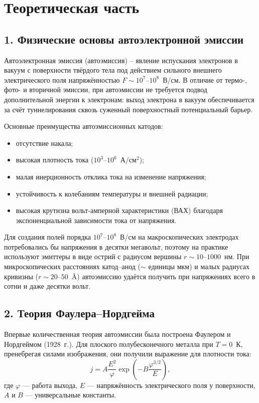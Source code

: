 \documentclass[12pt, a4paper]{article}
\begin{document}
\newpage


\section*{Теоретическая часть}

\subsection*{1. Физические основы автоэлектронной эмиссии}

Автоэлектронная эмиссия (автоэмиссия) -- явление испускания электронов в вакуум с поверхности твёрдого тела под действием сильного внешнего электрического поля напряжённостью $F \sim 10^{7}$--$10^{8}$~В/см. В отличие от термо-, фото- и вторичной эмиссии, при автоэмиссии не требуется подвод дополнительной энергии к электронам: выход электрона в вакуум обеспечивается за счёт туннелирования сквозь суженный поверхностный потенциальный барьер.

Основные преимущества автоэмиссионных катодов:
\begin{itemize}
    \item отсутствие накала;
    \item высокая плотность тока ($10^{3}$--$10^{6}$~А/см$^{2}$);
    \item малая инерционность отклика тока на изменение напряжения;
    \item устойчивость к колебаниям температуры и внешней радиации;
    \item высокая крутизна вольт-амперной характеристики (ВАХ) благодаря экспоненциальной зависимости тока от напряжения.
\end{itemize}

Для создания полей порядка $10^{7}$--$10^{8}$~В/см на макроскопических электродах потребовались бы напряжения в десятки мегавольт, поэтому на практике используют эмиттеры в виде острий с радиусом вершины $r \sim 10$--$1000$~нм. При микроскопических расстояниях катод--анод ($\sim$ единицы мкм) и малых радиусах кривизны ($r \sim 20$--$50$~\AA) автоэмиссию удаётся получить при напряжениях всего в сотни и даже десятки вольт.

\subsection*{2. Теория Фаулера--Нордгейма}

Впервые количественная теория автоэмиссии была построена Фаулером и Нордгеймом (1928~г.). Для плоского полубесконечного металла при $T = 0$~К, пренебрегая силами изображения, они получили выражение для плотности тока:
\begin{equation}
    j = A \frac{E^{2}}{\varphi}\exp\!\left(-B\frac{\varphi^{3/2}}{E}\right),
    \label{eq:FN}
\end{equation}
где $\varphi$ --- работа выхода, $E$ --- напряжённость электрического поля у поверхности, $A$ и $B$ --- универсальные константы.
\end{document}
